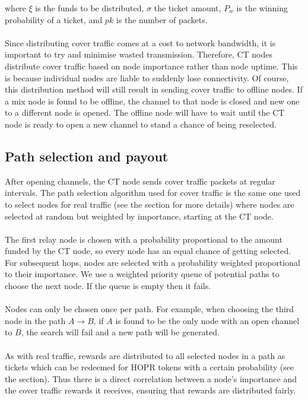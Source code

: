 where $\xi$ is the funds to be distributed, $\sigma$ the ticket amount, $P_w$ is the winning probability of a ticket, and $pk$ is the number of packets.
\\~\\Since distributing cover traffic comes at a cost to network bandwidth, it is important to try and minimise wasted transmission. Therefore, CT nodes distribute cover traffic based on node importance rather than node uptime. This is because individual nodes are liable to suddenly lose connectivity. Of course, this distribution method will still result in sending cover traffic to offline nodes. If a mix node is found to be offline, the channel to that node is closed and new one to a different node is opened. The offline node will have to wait until the CT node is ready to open a new channel to stand a chance of being reselected.

\subsection{Path selection and payout}
After opening channels, the CT node sends cover traffic packets at regular intervals. The path selection algorithm used for cover traffic is the same one used to select nodes for real traffic (see the  section for more details) where nodes are selected at random but weighted by importance, starting at the CT node.
\\~\\The first relay node is chosen with a probability proportional to the amount funded by the CT node, so every node has an equal chance of getting selected. For subsequent hops, nodes are selected with a probability weighted proportional to their importance. We use a weighted priority queue of potential paths to choose the next node. If the queue is empty then it fails.
\\~\\Nodes can only be chosen once per path. For example, when choosing the third node in the path $A\rightarrow B$, if $A$ is found to be the only node with an open channel to $B$, the search will fail and a new path will be generated.
\\~\\ As with real traffic, rewards are distributed to all selected nodes in a path as tickets which can be redeemed for HOPR tokens with a certain probability (see the  section). Thus there is a direct correlation between a node's importance and the cover traffic rewards it receives, ensuring that rewards are distributed fairly.


